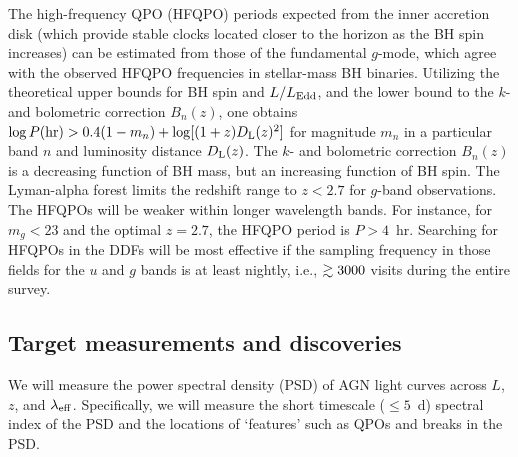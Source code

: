 The high-frequency QPO (HFQPO) periods expected from the inner accretion disk
(which provide stable clocks located closer to the horizon as the BH spin increases)
can be estimated from those of the fundamental $g$-mode, which agree with
the observed HFQPO frequencies in stellar-mass BH binaries. Utilizing the
theoretical upper bounds for BH spin and $L/L_{\rm Edd}$, and the lower
bound to the $k$- and bolometric correction $B_n(z)$, one obtains
$\log P({\rm hr}) > 0.4(1-m_n) + \log[(1+z)D_{\rm L}(z)^2]$ for magnitude
$m_n$ in a particular band $n$ and luminosity distance $D_{\rm L}(z)$.
The $k$- and bolometric correction $B_n(z)$ is a decreasing function of BH mass,
but an increasing function of BH spin. The Lyman-alpha forest limits the redshift
range to $z < 2.7$ for $g$-band observations. The HFQPOs will be weaker within longer
wavelength bands.
For instance, for $m_g  <  23$ and the optimal $z =  2.7$, the HFQPO period is $P > 4$~hr.
%
Searching for HFQPOs in the DDFs will be most effective if the sampling frequency
in those fields for the $u$ and $g$ bands is at least nightly, i.e., $\gtrsim3000$
visits during the entire survey.



\subsection{Target measurements and discoveries}
\label{sec:\secname:targets}

We will measure the power spectral density (PSD) of AGN light 
curves across $L$, $z$, and $\lambda_{\rm eff}$. Specifically, we will
 measure the short timescale ($\leq 5$~d) spectral index of the PSD and
 the locations of `features' such as QPOs
 and breaks in the PSD.

